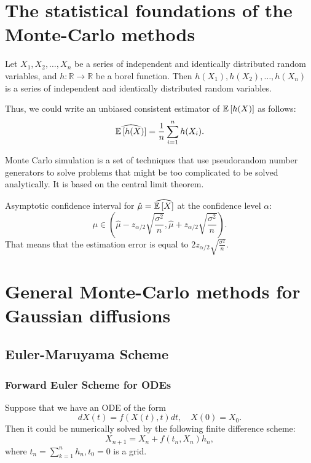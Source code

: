     \section{The statistical foundations of the Monte-Carlo methods}
        \begin{lemma}
            Let $X_1, X_2, \dots, X_n$ be a series of independent and identically distributed random variables, and $h: \mathbb{R} \to \mathbb{R}$ be a borel function. Then $h(X_1), h(X_2), \dots, h(X_n)$ is a series of independent and identically distributed random variables.
        \end{lemma}
        Thus, we could write an unbiased consistent estimator of $\mathbb{E} \left[h(X)\right]$ as follows:
        \begin{equation}
            \widehat{\mathbb{E} \left[h(X)\right]} = \frac{1}{n} \sum_{i=1}^n h(X_i).
        \end{equation}
        \begin{definition}
            Monte Carlo simulation is a set of techniques that use pseudorandom number generators to solve problems that might be too complicated to be solved analytically. It is based on the central limit theorem.
        \end{definition}
        Asymptotic confidence interval for $\hat{\mu} = \widehat{\mathbb{E}\left[X\right]}$ at the confidence level $\alpha$:
        \begin{equation}
            \mu \in \left(\hat{\mu} - z_{\alpha/2} \sqrt{\frac{\sigma^2}{n}}, \hat{\mu} + z_{\alpha/2} \sqrt{\frac{\sigma^2}{n}}\right).
        \end{equation}
        That means that the estimation error is equal to $2z_{\alpha/2} \sqrt{\frac{\sigma^2}{n}}$.


    \section{General Monte-Carlo methods for Gaussian diffusions}
        \subsection{Euler-Maruyama Scheme}
            \subsubsection{Forward Euler Scheme for ODEs}
                Suppose that we have an ODE of the form
                \begin{equation}
                    dX(t) = f(X(t), t)dt, \quad X(0) = X_0. \label{eq:ode1}
                \end{equation}
                Then it could be numerically solved by the following finite difference scheme:
                \begin{equation}
                    X_{n+1} = X_n + f(t_n, X_n)h_n, \label{Euler:ODE}
                \end{equation}
                where $t_n = \sum_{k=1}^n h_n, t_0 = 0$ is a grid. 


